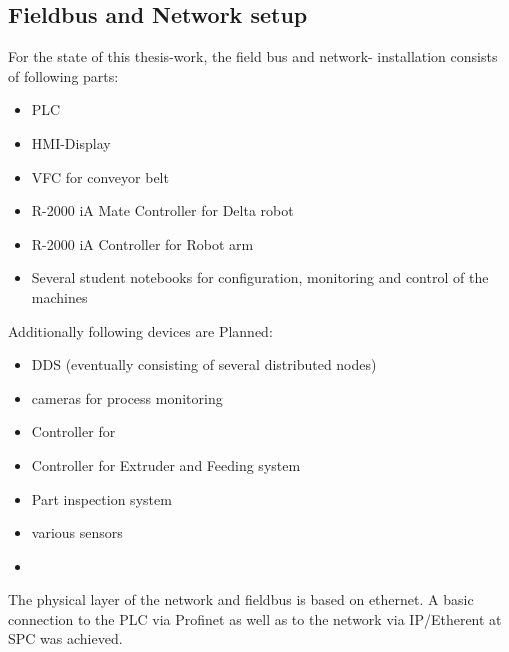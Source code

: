 \subsection{Fieldbus and Network setup}

For the state of this thesis-work, the field bus and network- installation consists of following parts:
\begin{itemize}
	\item \ac{PLC}
	\item \ac{HMI}-Display
	\item \ac{VFC} for conveyor belt
	\item R-2000 iA Mate Controller for Delta robot
	\item R-2000 iA Controller for Robot arm
	\item Several student notebooks for configuration, monitoring and control of the machines
\end{itemize}

Additionally following devices are Planned:
\begin{itemize}
	\item \ac{DDS} (eventually consisting of several distributed nodes)
	\item cameras for process monitoring 
	\item Controller for 
	\item Controller for Extruder and Feeding system
	\item Part inspection system
	\item various sensors
	\item 
\end{itemize}

The physical layer of the network and fieldbus is based on ethernet. A basic connection to the PLC via Profinet as well as to the network via IP/Etherent at \ac{SPC} was achieved.